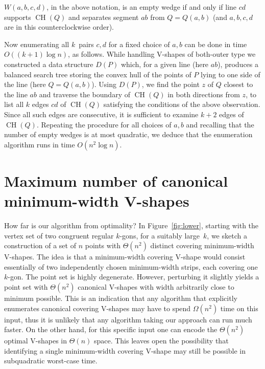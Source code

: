 \documentclass{llncs}
\DeclareMathOperator{\conv}{CH}
\begin{document}
\begin{observation}
  $W(a,b,c,d)$, in the above notation, is an empty wedge if and only
  if line $cd$ supports $\conv(Q)$ and separates segment $ab$
  from $Q=Q(a,b)$ (and $a,b,c,d$ are in this counterclockwise order).
\end{observation}

Now enumerating all $k$~pairs $c,d$ for a fixed choice of $a,b$ can be
done in time $O((k+1) \log n)$, as follows.
While handling V-shapes of both-outer type
we constructed a data structure $D(P)$ which, for a given line (here
$ab$), produces a balanced search tree storing the convex hull of the
points of $P$ lying to one side of the line (here $Q=Q(a,b)$).  Using
$D(P)$, we find the point $z$ of $Q$ closest to the line $ab$ and
traverse the boundary of $\conv(Q)$ in both directions from $z$,
to list all $k$ edges $cd$ of $\conv(Q)$ satisfying the conditions
of the above observation.  
Since all such edges are consecutive, it is sufficient to examine
$k+2$ edges of $\conv(Q)$.
Repeating the procedure for all choices of $a,b$ and recalling that
the number of empty wedges is at most quadratic, we deduce that the
enumeration algorithm runs in time $O(n^2\log n)$.



\section{Maximum number of canonical minimum-width V-shapes}
\label{sec:lower-bound}

How far is our algorithm from optimality?  In Figure~\ref{fig:lower},
starting with the vertex set of two congruent regular $k$-gons, for a
suitably large~$k$, we sketch a construction of a set of $n$ points
with $\Theta(n^2)$ distinct covering minimum-width V-shapes.  The idea
is that a minimum-width covering V-shape would consist essentially of
two independently chosen minimum-width strips, each covering one
$k$-gon.  The point set is highly degenerate.  However, perturbing it
slightly yields a point set with $\Theta(n^2)$ canonical V-shapes with
width arbitrarily close to minimum possible.  This is an indication
that any algorithm that explicitly enumerates canonical covering
V-shapes may have to spend $\Omega(n^2)$ time on this input, thus it
is unlikely that any algorithm taking our approach can run much
faster.  On the other hand, for this specific input one can encode the
$\Theta(n^2)$ optimal V-shapes in $\Theta(n)$ space.  This leaves open
the possibility that identifying a single minimum-width covering
V-shape may still be possible in subquadratic worst-case time.
\end{document}
